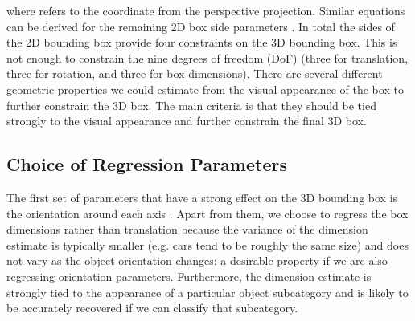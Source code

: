 \documentclass[10pt,twocolumn,letterpaper]{article}
\newif\ifarxiv
\begin{document}
where  refers to the  coordinate from the perspective projection. Similar equations can be derived for the remaining 2D box side parameters . In total the sides of the 2D bounding box provide four constraints on the 3D bounding box. This is not enough to constrain the nine degrees of freedom (DoF) (three for translation, three for rotation, and three for box dimensions). 
There are several different geometric properties we could estimate from the visual appearance of the box to further constrain the 3D box. The main criteria is that they should be tied strongly to the visual appearance and further constrain the final 3D box. 

\subsection{Choice of Regression Parameters}
The first set of parameters that have a strong effect on the 3D bounding box is the orientation around each axis . Apart from them, we choose to regress the box dimensions  rather than translation  because the variance of the dimension estimate is typically smaller (e.g. cars tend to be roughly the same size) and does not vary as the object orientation changes: a desirable property if we are also regressing orientation parameters. Furthermore, the dimension estimate is strongly tied to the appearance of a particular object subcategory and is likely to be accurately recovered if we can classify that subcategory. 
\ifarxiv
In Sec.~\ref{sec:alternative_representation} we carried out experiments on regressing alternative parameters related to translation and found that choice of parameters matters: we obtained less accurate 3D box reconstructions using that parametrization. 
The CNN architecture and  the associated loss functions for  this regression problem are discussed in Sec.~\ref{sec:cnn_regression}.
\fi
\end{document}
